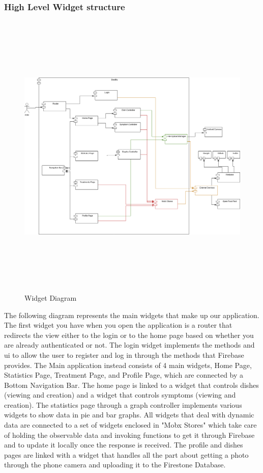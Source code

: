 \documentclass [12pt]{article}
\begin{document}
\subsubsection{High Level Widget structure}
\null
{}
\begin{figure}[ht!]
\centering
\includegraphics[height=14cm, width=\linewidth]{ComponentViewDiagram.png}
\caption{Widget Diagram}
\end{figure}  
\clearpage
The following diagram represents the main widgets that make up our application.
The first widget you have when you open the application is a router that redirects the view either to the login or to the home page based on whether you are already authenticated or not.
The login widget implements the methods and ui to allow the user to register and log in through the methods that Firebase provides.
The Main application instead consists of 4 main widgets, Home Page, Statistics Page, Treatment Page, and Profile Page, which are connected by a Bottom Navigation Bar.
The home page is linked to a widget that controls dishes (viewing and creation) and a widget that controls symptoms (viewing and creation).
The statistics page through a graph controller implements various widgets to show data in pie and bar graphs.
All widgets that deal with dynamic data are connected to a set of widgets enclosed in "Mobx Stores" which take care of holding the observable data and invoking functions to get it through Firebase and to update it locally once the response is received.
The profile and dishes pages are linked with a widget that handles all the part about getting a photo through the phone camera and uploading it to the Firestone Database.
\end{document}
